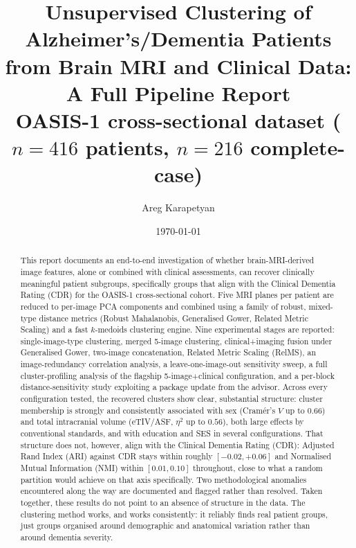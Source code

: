 \documentclass[11pt, a4paper]{article}
\title{
    \vspace{-1cm}
    {\Large\textbf{Unsupervised Clustering of Alzheimer's/Dementia Patients}}\\[6pt]
    {\large from Brain MRI and Clinical Data: A Full Pipeline Report}\\[4pt]
    {\normalsize OASIS-1 cross-sectional dataset ($n=416$ patients, $n=216$ complete-case)}
}
\author{Areg Karapetyan}
\date{\today}
\begin{document}
\maketitle
\vspace{-0.4cm}

\begin{abstract}
\noindent This report documents an end-to-end investigation of whether brain-MRI-derived image
features, alone or combined with clinical assessments, can recover clinically meaningful patient
subgroups, specifically groups that align with the Clinical Dementia Rating (CDR) for the
OASIS-1 cross-sectional cohort. Five MRI planes per patient are reduced to per-image PCA components
and combined using a family of robust, mixed-type distance metrics (Robust Mahalanobis, Generalised
Gower, Related Metric Scaling) and a fast $k$-medoids clustering engine. Nine experimental
stages are reported: single-image-type clustering, merged 5-image clustering, clinical+imaging
fusion under Generalised Gower, two-image concatenation, Related Metric Scaling (RelMS), an
image-redundancy correlation analysis, a leave-one-image-out sensitivity sweep, a full
cluster-profiling analysis of the flagship 5-image+clinical configuration, and a per-block
distance-sensitivity study exploiting a package update from the advisor. Across every configuration
tested, the recovered clusters show clear, substantial structure: cluster membership is strongly and
consistently associated with sex (Cram\'er's $V$ up to $0.66$) and total intracranial volume
(eTIV/ASF, $\eta^2$ up to $0.56$), both large effects by conventional standards, and with
education and SES in several configurations. That structure does not, however, align with the
Clinical Dementia Rating (CDR): Adjusted Rand Index (ARI) against CDR stays within roughly
$[-0.02, +0.06]$ and Normalised Mutual Information (NMI) within $[0.01, 0.10]$ throughout, close
to what a random partition would achieve on that axis specifically. Two methodological anomalies
encountered along the way are documented and flagged rather than resolved. Taken together, these
results do not point to an absence of structure in the data. The clustering method works, and works
consistently: it reliably finds real patient groups, just groups organised around demographic and
anatomical variation rather than around dementia severity.
\end{abstract}

\tableofcontents
\newpage

\end{document}
